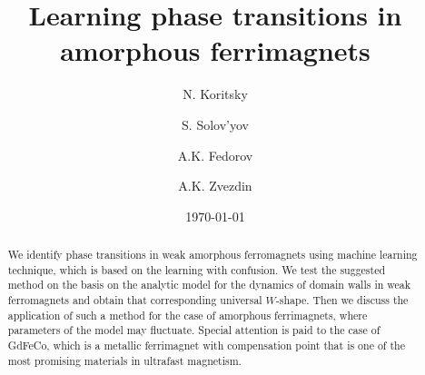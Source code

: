 \documentclass[aps,pra,twocolumn,amsmath,amssymb,nofootinbib,showpacs,superscriptaddress]{revtex4-1}
\theoremstyle{remark}
\begin{document}

    \title{Learning phase transitions in amorphous ferrimagnets}

    \author{N. Koritsky}

    \author{S. Solov'yov}

    \author{A.K. Fedorov}

    \author{A.K. Zvezdin}

    \date{\today}
    \begin{abstract}
        We identify phase transitions in weak amorphous ferromagnets using machine learning technique, which is based on the learning with confusion.
        We test the suggested method on the basis on the analytic model for the dynamics of domain walls in weak ferromagnets and obtain that corresponding universal $W$-shape.
        Then we discuss the application of such a method for the case of amorphous ferrimagnets, where parameters of the model may fluctuate.
        Special attention is paid to the case of GdFeCo, which is a metallic ferrimagnet with compensation point that is one of the most promising materials in ultrafast magnetism.
    \end{abstract}

    \maketitle



    
    
\end{document}
